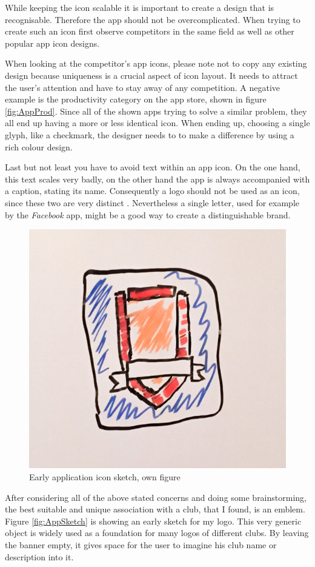 While keeping the icon scalable it is important to create a design that is recognisable. Therefore the app should not be overcomplicated. When trying to create such an icon first observe competitors in the same field as well as other popular app icon designs. \cite{Flarup:2015aa}

When looking at the competitor's app icons, please note not to copy any existing design because uniqueness is a crucial aspect of icon layout. It needs to attract the user's attention and have to stay away of any competition. A negative example is the productivity category on the app store, shown in figure \vref{fig:AppProd}. Since all of the shown apps trying to solve a similar problem, they all end up having a more or less identical icon. When ending up, choosing a single glyph, like a checkmark, the designer needs to to make a difference by using a rich colour design. \cite{Flarup:2015aa}

Last but not least you have to avoid text within an app icon. On the one hand, this text scales very badly, on the other hand the app is always accompanied with a caption, stating its name. Consequently a logo should not be used as an icon, since these two are very distinct \cite{Flarup:2015ab}. Nevertheless a single letter, used for example by the \emph{Facebook} app, might be a good way to create a distinguishable brand.

\begin{figure}[h]
  	\centering
  	\includegraphics[width=0.5\linewidth]{./images/app-sketch.jpg}
  	\caption{Early application icon sketch, own figure}
	\label{fig:AppSketch}
\end{figure}

After considering all of the above stated concerns and doing some brainstorming, the best suitable and unique association with a club, that I found, is an emblem. Figure \vref{fig:AppSketch} is showing an early sketch for my logo. This very generic object is widely used as a foundation for many logos of different clubs. By leaving the banner empty, it gives space for the user to imagine his club name or description into it. 

